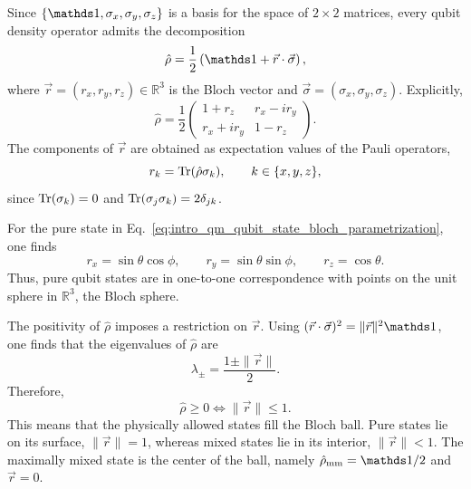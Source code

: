 Since $\{\id,\sigma_x,\sigma_y,\sigma_z\}$ is a basis for the space of $2\times 2$ matrices, every qubit density operator admits the decomposition
\begin{equation}
	\hat \rho
	=
	\frac{1}{2}\left(\id+\vec r\cdot\vec \sigma\right),
	\label{eq:intro_qm_bloch_representation}
\end{equation}
where $\vec r=(r_x,r_y,r_z)\in\mathds{R}^3$ is the Bloch vector and $\vec \sigma=(\sigma_x,\sigma_y,\sigma_z)$. Explicitly,
\begin{equation}
	\hat \rho=
	\frac{1}{2}
	\begin{pmatrix}
		1+r_z & r_x-ir_y \\
		r_x+ir_y & 1-r_z
	\end{pmatrix}.
	\label{eq:intro_qm_bloch_representation_explicit}
\end{equation}
The components of $\vec r$ are obtained as expectation values of the Pauli operators,
\begin{equation}
	r_k=\Tr(\hat \rho \sigma_k),
	\qquad
	k\in\{x,y,z\},
	\label{eq:intro_qm_bloch_vector_components}
\end{equation}
since $\Tr(\sigma_k)=0$ and $\Tr(\sigma_j\sigma_k)=2\delta_{jk}$.

For the pure state in Eq.~\eqref{eq:intro_qm_qubit_state_bloch_parametrization}, one finds
\begin{equation}
	r_x=\sin\theta\cos\phi,
	\qquad
	r_y=\sin\theta\sin\phi,
	\qquad
	r_z=\cos\theta.
	\label{eq:intro_qm_bloch_vector_pure_state}
\end{equation}
Thus, pure qubit states are in one-to-one correspondence with points on the unit sphere in $\mathds{R}^3$, the Bloch sphere.

The positivity of $\hat \rho$ imposes a restriction on $\vec r$. Using $(\vec r\cdot\vec \sigma)^2=\|\vec r\|^2\id$, one finds that the eigenvalues of $\hat \rho$ are
\begin{equation}
	\lambda_\pm=\frac{1\pm \|\vec r\|}{2}.
	\label{eq:intro_qm_bloch_density_operator_eigenvalues}
\end{equation}
Therefore,
\begin{equation}
	\hat \rho\geq 0
	\iff
	\|\vec r\|\leq 1.
	\label{eq:intro_qm_bloch_ball_condition}
\end{equation}
This means that the physically allowed states fill the Bloch ball. Pure states lie on its surface, $\|\vec r\|=1$, whereas mixed states lie in its interior, $\|\vec r\|<1$. The maximally mixed state is the center of the ball, namely $\hat \rho_{\mathrm{mm}}=\id/2$ and $\vec r=0$.

